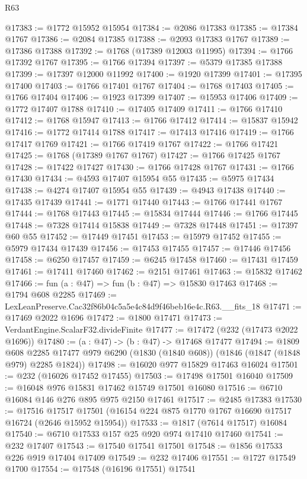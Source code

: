 \begin{lexlean}{R63}
\begin{coremodule}
@17383 := @1772 @15952 @15954
@17384 := @2086 @17383
@17385 := @17384 @1767
@17386 := @2084 @17385
@17388 := @2093 @17383 @1767
@17389 := @17386 @17388
@17392 := @1768 (@17389 @12003 @11995)
@17394 := @1766 @17392 @1767
@17395 := @1766 @17394
@17397 := @5379 @17385 @17388
@17399 := @17397 @12000 @11992
@17400 := @1920 @17399
@17401 := @17395 @17400
@17403 := @1766 @17401 @1767
@17404 := @1768 @17403
@17405 := @1766 @17404
@17406 := @1923 @17399
@17407 := @15953 @17406
@17409 := @1772 @17407 @1788
@17410 := @17405 @17409
@17411 := @1766 @17410
@17412 := @1768 @15947
@17413 := @1766 @17412
@17414 := @15837 @15942
@17416 := @1772 @17414 @1788
@17417 := @17413 @17416
@17419 := @1766 @17417 @1769
@17421 := @1766 @17419 @1767
@17422 := @1766 @17421
@17425 := @1768 (@17389 @1767 @1767)
@17427 := @1766 @17425 @1767
@17428 := @17422 @17427
@17430 := @1766 @17428 @1767
@17431 := @1766 @17430
@17434 := @4593 @17407 @15954 @55
@17435 := @5975 @17434
@17438 := @4274 @17407 @15954 @55
@17439 := @4943 @17438
@17440 := @17435 @17439
@17441 := @1771 @17440
@17443 := @1766 @17441 @1767
@17444 := @1768 @17443
@17445 := @15834 @17444
@17446 := @1766 @17445
@17448 := @7328 @17414 @15838
@17449 := @7328 @17448
@17451 := @17397 @60 @55
@17452 := @17449 @17451
@17453 := @15979 @17452
@17455 := @5979 @17434 @17439
@17456 := @17453 @17455
@17457 := @17446 @17456
@17458 := @6250 @17457
@17459 := @6245 @17458
@17460 := @17431 @17459
@17461 := @17411 @17460
@17462 := @2151 @17461
@17463 := @15832 @17462
@17466 := fun (a : @47) => fun (b : @47) => @15830 @17463
@17468 := @1794 @608 @2285
@17469 := LexLeanPreserve.Cac32f86b04c5a5e4c84d9f46beb16e4c.R63.__fits_18
@17471 := @17469 @2022 @1696
@17472 := @1800 @17471
@17473 := VerdantEngine.ScalarF32.divideFinite
@17477 := @17472 (@232 (@17473 @2022 @1696))
@17480 := (a : @47) -> (b : @47) -> @17468 @17477
@17494 := @1809
    @608
    @2285
    @17477
    @979
    @6290
    (@1830 (@1840 @608))
    (@1846 (@1847 (@1848 @979) @2285 @1824))
@17498 := @16020 @977 @15829 @17463 @16024
@17501 := @232 (@16026 @17452 @17455)
@17503 := @17498 @17501 @16040
@17509 := @16048 @976 @15831 @17462 @15749 @17501 @16080
@17516 := @6710 @16084 @146 @276 @895 @975 @2150 @17461
@17517 := @2485 @17383
@17530 := @17516
    @17517
    @17501
    (@16154 @224 @875 @1770 @1767 @16690 @17517 @16724 (@2646 @15952 @15954))
@17533 := @1817 (@7614 @17517) @16084
@17540 := @6710 @17533 @157 @25 @920 @974 @17410 @17460
@17541 := @232 @17407
@17543 := @17540 @17541 @17501
@17548 := @1856 @17533 @226 @919 @17404 @17409
@17549 := @232 @17406
@17551 := @1727 @17549 @1700
@17554 := @17548 (@16196 @17551) @17541

\end{coremodule}
\end{lexlean}
